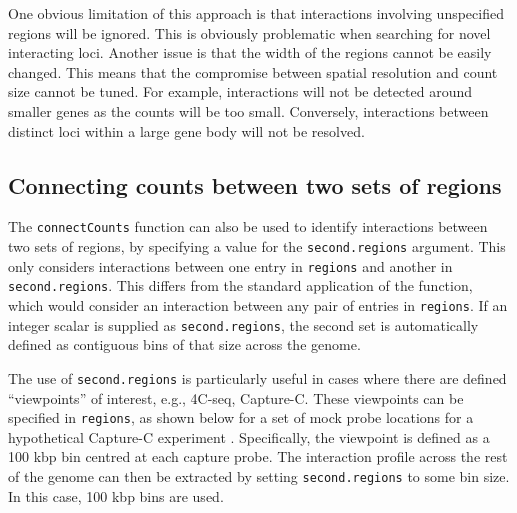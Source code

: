 \documentclass[12pt]{report}
\newcommand{\code}[1]{{\small\texttt{#1}}}
\begin{document}
One obvious limitation of this approach is that interactions involving unspecified regions will be ignored.
This is obviously problematic when searching for novel interacting loci.
Another issue is that the width of the regions cannot be easily changed.
This means that the compromise between spatial resolution and count size cannot be tuned.
For example, interactions will not be detected around smaller genes as the counts will be too small.
Conversely, interactions between distinct loci within a large gene body will not be resolved.

\subsection{Connecting counts between two sets of regions}
The \code{connectCounts} function can also be used to identify interactions between two sets of regions, by specifying a value for the \code{second.regions} argument.
This only considers interactions between one entry in \code{regions} and another in \code{second.regions}.
This differs from the standard application of the function, which would consider an interaction between any pair of entries in \code{regions}.
If an integer scalar is supplied as \code{second.regions}, the second set is automatically defined as contiguous bins of that size across the genome.

The use of \code{second.regions} is particularly useful in cases where there are defined ``viewpoints'' of interest, e.g., 4C-seq, Capture-C.
These viewpoints can be specified in \code{regions}, as shown below for a set of mock probe locations for a hypothetical Capture-C experiment \citep{hughes2014analysis}.
Specifically, the viewpoint is defined as a 100 kbp bin centred at each capture probe.
The interaction profile across the rest of the genome can then be extracted by setting \code{second.regions} to some bin size.
In this case, 100 kbp bins are used.
\end{document}
